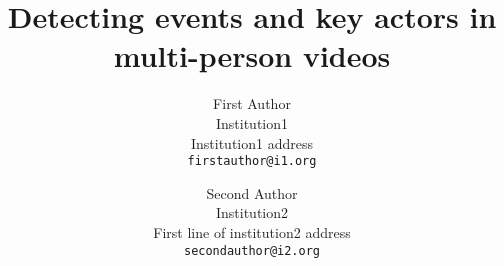 \documentclass[10pt,twocolumn,letterpaper]{article}
\begin{document}
\title{Detecting events and key actors in multi-person videos}

\author{First Author\\
Institution1\\
Institution1 address\\
{\tt\small firstauthor@i1.org}
\and
Second Author\\
Institution2\\
First line of institution2 address\\
{\tt\small secondauthor@i2.org}
}

\maketitle















{\small


}
\end{document}
